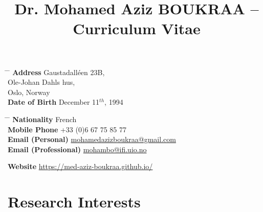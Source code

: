 \documentclass[10pt]{article} %
\begin{document}

\title{Dr. Mohamed Aziz BOUKRAA -- Curriculum Vitae} %





\parbox{0.5\textwidth}{ %
\begin{tabbing} %
\hspace{2.5cm} \= \hspace{4cm} \= \kill %
{\bf Address} \> Gaustadalléen 23B,\\ %
\> Ole-Johan Dahls hus,\\
 Oslo, Norway \\ %
{\bf Date of Birth} \>  December 11$^{th}$, 1994 \\%
\end{tabbing}}
\hspace{0.5cm}
\parbox{0.5\textwidth}{ %
\begin{tabbing} %
\hspace{3.5cm} \= \hspace{4cm} \= \kill %
{\bf Nationality} \> French \\%
{\bf Mobile Phone} \> +33 (0)6 67 75 85 77 \\ %
{\bf Email (Personal)} \> \href{mailto:mohamedazizboukraa@gmail.com}{mohamedazizboukraa@gmail.com} \\ %
{\bf Email (Professional)} \> \href{mailto:mohambo@ifi.uio.no}{mohambo@ifi.uio.no} \\ %
\end{tabbing}}

\vspace{-0.7cm}
{\bf Website}  \href{https://med-aziz-boukraa.github.io/}{https://med-aziz-boukraa.github.io/} \\ %

\section{Research Interests}
\end{document}

